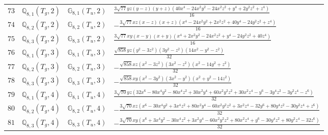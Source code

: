 \documentclass[fleqn,8pt,landscape]{jsarticle}
\begin{document}
\begin{table}[ht!]
\begin{center}
\begin{tabular}{cccl}
$ 73 $ & $ \mathbb{Q}_{8,1}(T_{g},2) $ & $ \mathbb{G}_{8,1}(T_{u},2) $ & $ \frac{3 \sqrt{77} y z \left(y - z\right) \left(y + z\right) \left(40 x^{4} - 24 x^{2} y^{2} - 24 x^{2} z^{2} + y^{4} + 2 y^{2} z^{2} + z^{4}\right)}{16} $ \\
$ 74 $ & $ \mathbb{Q}_{8,2}(T_{g},2) $ & $ \mathbb{G}_{8,2}(T_{u},2) $ & $ - \frac{3 \sqrt{77} x z \left(x - z\right) \left(x + z\right) \left(x^{4} - 24 x^{2} y^{2} + 2 x^{2} z^{2} + 40 y^{4} - 24 y^{2} z^{2} + z^{4}\right)}{16} $ \\
$ 75 $ & $ \mathbb{Q}_{8,3}(T_{g},2) $ & $ \mathbb{G}_{8,3}(T_{u},2) $ & $ \frac{3 \sqrt{77} x y \left(x - y\right) \left(x + y\right) \left(x^{4} + 2 x^{2} y^{2} - 24 x^{2} z^{2} + y^{4} - 24 y^{2} z^{2} + 40 z^{4}\right)}{16} $ \\
$ 76 $ & $ \mathbb{Q}_{8,1}(T_{g},3) $ & $ \mathbb{G}_{8,1}(T_{u},3) $ & $ \frac{\sqrt{858} y z \left(y^{2} - 3 z^{2}\right) \left(3 y^{2} - z^{2}\right) \left(14 x^{2} - y^{2} - z^{2}\right)}{32} $ \\
$ 77 $ & $ \mathbb{Q}_{8,2}(T_{g},3) $ & $ \mathbb{G}_{8,2}(T_{u},3) $ & $ - \frac{\sqrt{858} x z \left(x^{2} - 3 z^{2}\right) \left(3 x^{2} - z^{2}\right) \left(x^{2} - 14 y^{2} + z^{2}\right)}{32} $ \\
$ 78 $ & $ \mathbb{Q}_{8,3}(T_{g},3) $ & $ \mathbb{G}_{8,3}(T_{u},3) $ & $ - \frac{\sqrt{858} x y \left(x^{2} - 3 y^{2}\right) \left(3 x^{2} - y^{2}\right) \left(x^{2} + y^{2} - 14 z^{2}\right)}{32} $ \\
$ 79 $ & $ \mathbb{Q}_{8,1}(T_{g},4) $ & $ \mathbb{G}_{8,1}(T_{u},4) $ & $ \frac{3 \sqrt{70} y z \left(32 x^{6} - 80 x^{4} y^{2} - 80 x^{4} z^{2} + 30 x^{2} y^{4} + 60 x^{2} y^{2} z^{2} + 30 x^{2} z^{4} - y^{6} - 3 y^{4} z^{2} - 3 y^{2} z^{4} - z^{6}\right)}{32} $ \\
$ 80 $ & $ \mathbb{Q}_{8,2}(T_{g},4) $ & $ \mathbb{G}_{8,2}(T_{u},4) $ & $ - \frac{3 \sqrt{70} x z \left(x^{6} - 30 x^{4} y^{2} + 3 x^{4} z^{2} + 80 x^{2} y^{4} - 60 x^{2} y^{2} z^{2} + 3 x^{2} z^{4} - 32 y^{6} + 80 y^{4} z^{2} - 30 y^{2} z^{4} + z^{6}\right)}{32} $ \\
$ 81 $ & $ \mathbb{Q}_{8,3}(T_{g},4) $ & $ \mathbb{G}_{8,3}(T_{u},4) $ & $ - \frac{3 \sqrt{70} x y \left(x^{6} + 3 x^{4} y^{2} - 30 x^{4} z^{2} + 3 x^{2} y^{4} - 60 x^{2} y^{2} z^{2} + 80 x^{2} z^{4} + y^{6} - 30 y^{4} z^{2} + 80 y^{2} z^{4} - 32 z^{6}\right)}{32} $ \\
 \hline \hline
\end{tabular}
\end{center}
\end{table}
\end{document}
